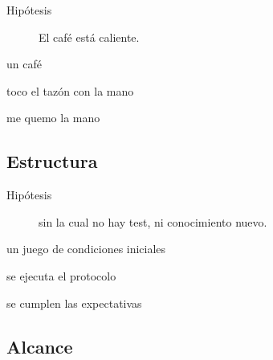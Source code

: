   \begin{frame}{\insertsubsection}
    \vspace{-2.8em}
    \begin{description}
      \item[Hipótesis] El café está caliente.
    \end{description}
    \vspace{+0.7em}
    \begin{description}
      \item<2->[\alert{Dado}] un café
      \item<3->[\alert{Cuando}] toco el tazón con la mano
      \item<4->[\alert{Entonces}] me quemo la mano
    \end{description}
  \end{frame}

%
\subsection{Estructura}

  \begin{frame}{\insertsubsection}
    \vspace{-2.8em}
    \begin{description}
      \item[Hipótesis] sin la cual no hay test, ni conocimiento nuevo.
    \end{description}
    \vspace{+0.7em}
    \begin{description}
      \item<2->[Dado] un juego de \alert{condiciones iniciales}
      \item<3->[Cuando] se ejecuta el \alert{protocolo}
      \item<4->[Entonces] se cumplen las \alert{expectativas}
    \end{description}
  \end{frame}

%
\subsection{Alcance}

